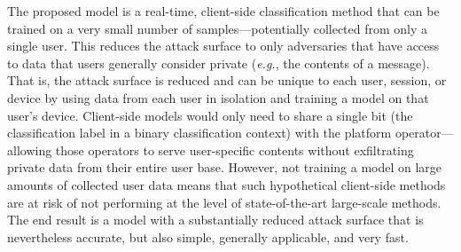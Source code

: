 \documentclass[preprint,12pt]{article}
\begin{document}
The proposed model is a real-time, client-side classification method that can be trained on a very small number of samples---potentially collected from only a single user.
This reduces the attack surface to only adversaries that have access to data that users generally consider private (\textit{e.g.}, the contents of a message). 
That is, the attack surface is reduced and can be unique to each user, session, or device by using data from each user in isolation and training a model on that user's device. Client-side models would only need to share a single bit (the classification label in a binary classification context) with the platform operator---allowing those operators to serve user-specific contents without exfiltrating private data from their entire user base. 
However, not training a model on large amounts of collected user data means that such hypothetical client-side methods are at risk of not performing at the level of state-of-the-art large-scale methods.
The end result is a model with a substantially reduced attack surface that is nevertheless accurate, but also simple, generally applicable, and very fast.



 

\end{document}
